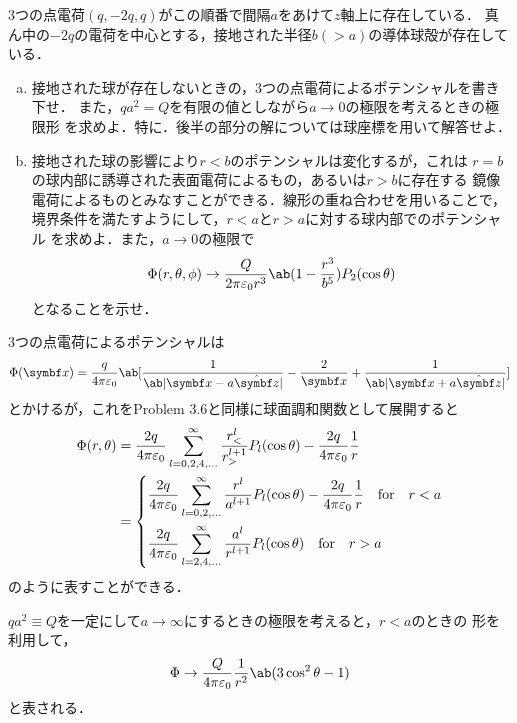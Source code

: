 \begin{bx1}
  3つの点電荷$(q, -2q, q)$がこの順番で間隔$a$をあけて$z$軸上に存在している．
  真ん中の$-2q$の電荷を中心とする，接地された半径$b(>a)$の導体球殻が存在している．
  \begin{enumerate}[(a)]%
    \item  
      接地された球が存在しないときの，3つの点電荷によるポテンシャルを書き下せ．
      また，$qa^2 = Q$を有限の値としながら$a \to 0$の極限を考えるときの極限形
      を求めよ．特に．後半の部分の解については球座標を用いて解答せよ．
    \item 
      接地された球の影響により$r < b$のポテンシャルは変化するが，これは
      $r = b$の球内部に誘導された表面電荷によるもの，あるいは$r > b$に存在する
      鏡像電荷によるものとみなすことができる．線形の重ね合わせを用いることで，
      境界条件を満たすようにして，$r < a$と$r > a$に対する球内部でのポテンシャル
      を求めよ．また，$a \to 0$の極限で
      \begin{gather}%
        \Phi(r, \theta,\phi)  \to \frac{Q}{2\pi\eps_0r^3} \ab(1 - \frac{r^3}{b^5})P_2(\cos\theta)
      \end{gather}%
      となることを示せ．
  \end{enumerate}%
\end{bx1}

  3つの点電荷によるポテンシャルは
  \begin{gather}%
    \Phi(\bs{x}) = \frac{q}{4\pi \eps_0} \ab[
      \frac{1}{\ab|\bs{x} - a\hat{\bs{z}}|} - \frac{2}{\bs{x}} + \frac{1}{\ab|\bs{x} + a \hat{\bs{z}}|}
    ]
  \end{gather}%
  とかけるが，これをProblem 3.6と同様に球面調和関数として展開すると
  \begin{align}%
    \Phi(r, \theta) &= \frac{2q}{4\pi \eps_0} \sum_{l = 0, 2, 4, \ldots}^{\infty} \frac{r_<^l}{r_>^{l+1}} P_l(\cos\theta) - \frac{2q}{4\pi\eps_0}\frac{1}{r}\notag\\
    &= 
    \begin{dcases}%
      \frac{2q}{4\pi\eps_0} \sum_{l=0,2,\ldots}^\infty \frac{r^l}{a^{l+1}} P_l(\cos\theta) - \frac{2q}{4\pi\eps_0} \frac{1}{r}\qqtext{for} r < a\\
      \frac{2q}{4\pi\eps_0} \sum_{l=2, 4, \ldots}^\infty \frac{a^l}{r^{l+1}} P_l(\cos\theta)
      \qqtext{for} r > a
    \end{dcases}%
  \end{align}%
  のように表すことができる．
  
$qa^2 \equiv Q$を一定にして$a \to \infty$にするときの極限を考えると，$r<a$のときの
形を利用して，
\begin{gather}%
  \Phi \to \frac{Q}{4\pi \eps_0} \frac{1}{r^2} \ab(3\cos^2 \theta - 1)
\end{gather}%
と表される．

